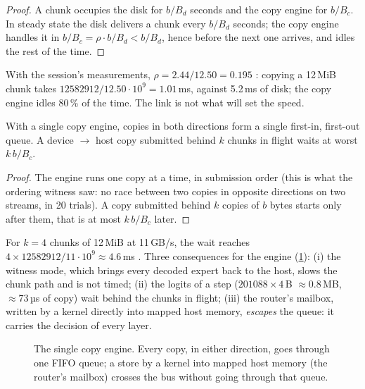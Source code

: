 \begin{proof}
A chunk occupies the disk for $b/B_d$ seconds and the copy engine for $b/B_c$. In steady state the disk delivers a chunk every $b/B_d$ seconds; the copy engine handles it in $b/B_c = \rho \cdot b/B_d < b/B_d$, hence before the next one arrives, and idles the rest of the time.
\end{proof}

With the session's measurements, $\rho = 2.44 / 12.50 = 0.195$ \calc: copying a 12\,MiB chunk takes $\num{12582912} / 12.50\cdot10^9 = 1.01$\,ms, against 5.2\,ms of disk; the copy engine idles 80\,\% of the time. The link is not what will set the speed.

\begin{proposition}\label{prop:t2c-moteur-unique}
With a single copy engine, copies in both directions form a single first-in, first-out queue. A device $\to$ host copy submitted behind $k$ chunks in flight waits at worst $k\,b / B_c$.
\end{proposition}

\begin{proof}
The engine runs one copy at a time, in submission order (this is what the ordering witness saw: no race between two copies in opposite directions on two streams, in 20 trials). A copy submitted behind $k$ copies of $b$ bytes starts only after them, that is at most $k\,b/B_c$ later.
\end{proof}

For $k = 4$ chunks of 12\,MiB at 11\,GB/s, the wait reaches $4 \times \num{12582912} / 11\cdot10^9 \approx 4.6$\,ms \calc. Three consequences for the engine (\cref{fig:t2c-moteur-copie}): (i) the witness mode, which brings every decoded expert back to the host, slows the chunk path and is not timed; (ii) the logits of a step ($\num{201088} \times 4$\,B $\approx 0.8$\,MB, $\approx 73$\,µs of copy) wait behind the chunks in flight; (iii) the router's mailbox, written by a kernel directly into mapped host memory, \emph{escapes} the queue: it carries the decision of every layer.

\begin{figure}[ht]
\centering
\SchemaChmMoteurCopie
\caption[The single copy engine]{The single copy engine. Every copy, in either direction, goes through one FIFO queue; a store by a kernel into mapped host memory (the router's mailbox) crosses the bus without going through that queue.}
\label{fig:t2c-moteur-copie}
\end{figure}

